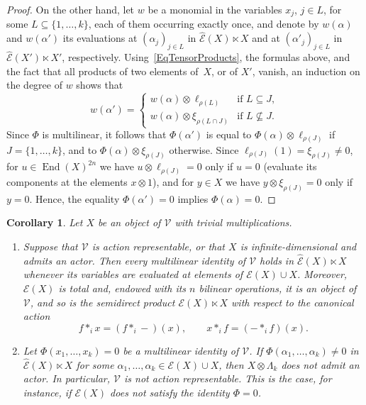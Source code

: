 \documentclass[reqno,a4paper]{amsart}
\theoremstyle{plain}
\newtheorem{corollary}[subsection]{Corollary}
\theoremstyle{definition}
\theoremstyle{remark}
\numberwithin{equation}{section}
\newcommand{\E}{\mathcal{E}}
\newcommand{\V}{\mathcal{V}}
\DeclareMathOperator{\End}{End}
\begin{document}
\begin{proof}
On the other hand, let $w$ be a monomial in the variables $x_j$, $j\in L$, for some $L\subseteq\{1,\ldots,k\}$, each of them occurring exactly once, and denote by $w(\alpha)$ and $w(\alpha')$ its evaluations at $(\alpha_j)_{j\in L}$ in $\widehat{\E}(X)\ltimes X$ and at $(\alpha'_j)_{j\in L}$ in $\widehat{\E}(X')\ltimes X'$, respectively. Using~\eqref{EqTensorProducts}, the formulas above, and the fact that all products of two elements of~$X$, or of $X'$, vanish, an induction on the degree of $w$ shows that
\[
w(\alpha')=
\begin{cases}
w(\alpha)\otimes\ell_{\rho(L)} & \text{if } L\subseteq J,\\[0.2em]
w(\alpha)\otimes\xi_{\rho(L\cap J)} & \text{if } L\not\subseteq J.
\end{cases}
\]
Since $\Phi$ is multilinear, it follows that $\Phi(\alpha')$ is equal to $\Phi(\alpha)\otimes\ell_{\rho(J)}$ if $J=\{1,\ldots,k\}$, and to $\Phi(\alpha)\otimes\xi_{\rho(J)}$ otherwise. Since $\ell_{\rho(J)}(1)=\xi_{\rho(J)}\neq0$, for $u\in\End(X)^{2n}$ we have $u\otimes\ell_{\rho(J)}=0$ only if $u=0$ (evaluate its components at the elements $x\otimes1$), and for $y\in X$ we have $y\otimes\xi_{\rho(J)}=0$ only if $y=0$. Hence, the equality $\Phi(\alpha')=0$ implies $\Phi(\alpha)=0$.
\end{proof}

\begin{corollary}\label{CorTensorObstruction}
Let $X$ be an object of $\V$ with trivial multiplications.
\begin{enumerate}
\item Suppose that $\V$ is action representable, or that $X$ is infinite-dimensional and admits an actor. Then every multilinear identity of $\V$ holds in $\widehat{\E}(X)\ltimes X$ whenever its variables are evaluated at elements of $\E(X)\cup X$. Moreover, $\E(X)$ is total and, endowed with its $n$ bilinear operations, it is an object of~$\V$, and so is the semidirect product $\E(X)\ltimes X$ with respect to the canonical action
\[
f\ast_ix=(f\ast_i-)(x),
\qquad
x\ast_if=(-\ast_if)(x).
\]
\item Let $\Phi(x_1,\ldots,x_k)=0$ be a multilinear identity of $\V$. If $\Phi(\alpha_1,\ldots,\alpha_k)\neq0$ in $\widehat{\E}(X)\ltimes X$ for some $\alpha_1,\ldots,\alpha_k\in\E(X)\cup X$, then $X\otimes\Lambda_k$ does not admit an actor. In particular, $\V$ is not action representable. This is the case, for instance, if $\E(X)$ does not satisfy the identity $\Phi=0$.
\end{enumerate}
\end{corollary}
\end{document}
